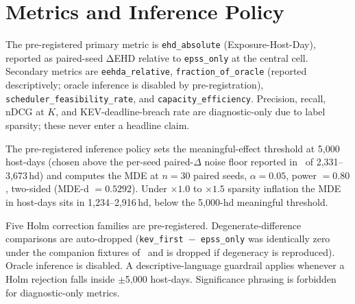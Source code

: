 \section{Metrics and Inference Policy}
The pre-registered primary metric is \texttt{ehd\_absolute} (Exposure-Host-Day), reported as paired-seed ΔEHD relative to \texttt{epss\_only} at the central cell. Secondary metrics are \texttt{eehda\_relative}, \texttt{fraction\_of\_oracle} (reported descriptively; oracle inference is disabled by pre-registration), \texttt{scheduler\_feasibility\_rate}, and \texttt{capacity\_efficiency}. Precision, recall, nDCG at $K$, and KEV-deadline-breach rate are diagnostic-only due to label sparsity; these never enter a headline claim.

The pre-registered inference policy sets the meaningful-effect threshold at 5,000 host-days (chosen above the per-seed paired-$\Delta$ noise floor reported in~\cite{Malla2026VulnPrio} of 2,331--3,673\,hd) and computes the MDE at $n = 30$ paired seeds, $\alpha = 0.05$, power $= 0.80$, two-sided (MDE-d $= 0.5292$). Under $\times 1.0$ to $\times 1.5$ sparsity inflation the MDE in host-days sits in 1,234--2,916\,hd, below the 5,000-hd meaningful threshold.

Five Holm correction families are pre-registered. Degenerate-difference comparisons are auto-dropped (\texttt{kev\_first $-$ epss\_only} was identically zero under the companion fixtures of~\cite{Malla2026VulnPrio} and is dropped if degeneracy is reproduced). Oracle inference is disabled. A descriptive-language guardrail applies whenever a Holm rejection falls inside $\pm$5,000 host-days. Significance phrasing is forbidden for diagnostic-only metrics.
